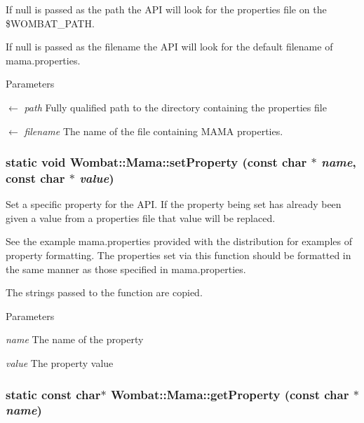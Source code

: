 If null is passed as the path the API will look for the properties file on the \$WOMBAT\_\-PATH.

If null is passed as the filename the API will look for the default filename of mama.properties.


\begin{DoxyParams}{Parameters}
\item[\mbox{$\leftarrow$} {\em path}]Fully qualified path to the directory containing the properties file\item[\mbox{$\leftarrow$} {\em filename}]The name of the file containing MAMA properties. \end{DoxyParams}
\hypertarget{classWombat_1_1Mama_a696c8766933e24199c71380fa5c2a709}{
\subsubsection[{setProperty}]{\setlength{\rightskip}{0pt plus 5cm}static void Wombat::Mama::setProperty (const char $\ast$ {\em name}, \/  const char $\ast$ {\em value})}}
\label{classWombat_1_1Mama_a696c8766933e24199c71380fa5c2a709}


Set a specific property for the API. If the property being set has already been given a value from a properties file that value will be replaced.

See the example mama.properties provided with the distribution for examples of property formatting. The properties set via this function should be formatted in the same manner as those specified in mama.properties.

The strings passed to the function are copied.


\begin{DoxyParams}{Parameters}
\item[{\em name}]The name of the property \item[{\em value}]The property value \end{DoxyParams}
\hypertarget{classWombat_1_1Mama_ae53b3daafe7452f80406ff5204c99cc6}{
\subsubsection[{getProperty}]{\setlength{\rightskip}{0pt plus 5cm}static const char$\ast$ Wombat::Mama::getProperty (const char $\ast$ {\em name})}}
\label{classWombat_1_1Mama_ae53b3daafe7452f80406ff5204c99cc6}


